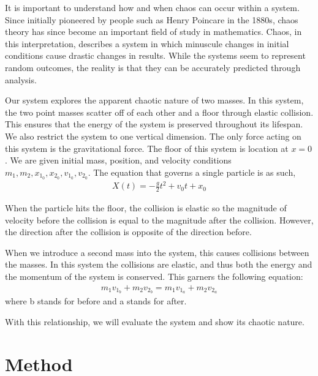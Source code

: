 \documentclass[pra,twocolumn,showpacs,amsmath,amssymb]{revtex4-2}
\begin{document}
It is important to understand how and when chaos can occur within a system. Since initially pioneered by people such as Henry Poincare in the 1880s, chaos theory has since become an important field of study in mathematics. Chaos, in this interpretation, describes a system in which minuscule changes in initial conditions cause drastic changes in results. While the systems seem to represent random outcomes, the reality is that they can be accurately predicted through analysis. 
\par Our system explores the apparent chaotic nature of two masses. In this system, the two point masses scatter off of each other and a floor through elastic collision. This ensures that the energy of the system is preserved throughout its lifespan. We also restrict the system to one vertical dimension. The only force acting on this system is the gravitational force. The floor of this system is location at \(x = 0\). We are given initial mass, position, and velocity conditions \(m_1, m_2, x_{1_0}, x_{2_0}, v_{1_0}, v_{2_0}\). The equation that governs a single particle is as such, 
\begin{eqnarray}
X(t) = -\frac{g}{2}t^2 + v_0 t + x_0
\end{eqnarray}
\par When the particle hits the floor, the collision is elastic so the magnitude of velocity before the collision is equal to the magnitude after the collision. However, the direction after the collision is opposite of the direction before.
\par When we introduce a second mass into the system, this causes collisions between the masses. In this system the collisions are elastic, and thus both the energy and the momentum of the system is conserved. This garners the following equation:
\begin{eqnarray}
m_1 v_{1_b} + m_2 v_{2_b} = m_1 v_{1_a} + m_2 v_{2_a}
\end{eqnarray}
where b stands for before and a stands for after.
\par With this relationship, we will evaluate the system and show its chaotic nature.

\section{Method} \label{sec:method}
\end{document}
